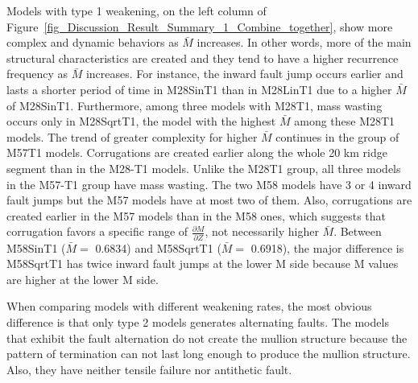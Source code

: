 Models with type 1 weakening, on the left column of Figure~\hyperref[fig_Discussion_Result_Summary_1_Combine_together]{\ref{fig_Discussion_Result_Summary_1_Combine_together}}, show more complex and dynamic behaviors as $\bar{M}$ increases. In other words, more of the main structural characteristics are created and they tend to have a higher recurrence frequency as $\bar{M}$ increases. %
%
For instance, %
the inward fault jump occurs earlier and lasts a shorter period of time in M28SinT1 than in M28LinT1 due to a higher $\bar{M}$ of M28SinT1. Furthermore, among three models with M28T1, mass wasting occurs only in M28SqrtT1, the model with the highest $\bar{M}$ among these M28T1 models. 
The trend of greater complexity for higher $\bar{M}$ continues in the group of M57T1 models. Corrugations are created earlier along the whole 20 km ridge segment than in the M28-T1 models. Unlike the M28T1 group, all three models in the M57-T1 group have mass wasting. %
The two M58 models have 3 or 4 inward fault jumps but the M57 models have at most two of them. Also, corrugations are created earlier in the M57 models than in the M58 ones, which suggests that corrugation favors a specific range of $\frac{\partial M}{\partial Z}$, not necessarily higher $\bar{M}$. Between M58SinT1 ($\bar{M} =$ 0.6834) and M58SqrtT1 ($\bar{M} =$ 0.6918), the major difference is M58SqrtT1 has twice inward fault jumps at the lower M side because M values are higher at the lower M side.

When comparing models with different weakening rates, the most obvious difference is that only type 2 models generates alternating faults. The models that exhibit the fault alternation do not create the mullion structure because the pattern of termination can not last long enough to produce the mullion structure. Also, they have neither tensile failure nor antithetic fault.


